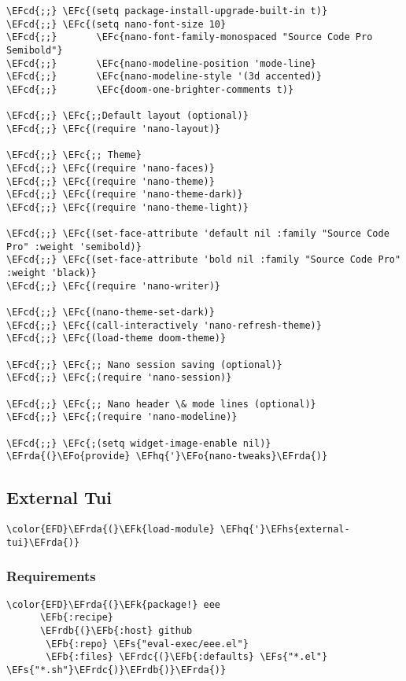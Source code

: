 \documentclass[a4wide,10pt]{article}
\newcommand{\EFc}[1]{\textcolor{EFc}{#1}} %
\newcommand{\EFcd}[1]{\textcolor{EFcd}{#1}} %
\newcommand{\EFs}[1]{\textcolor{EFs}{#1}} %
\newcommand{\EFk}[1]{\textcolor{EFk}{#1}} %
\newcommand{\EFb}[1]{\textcolor{EFb}{#1}} %
\newcommand{\EFo}[1]{\textcolor{EFo}{#1}} %
\newcommand{\EFhq}[1]{\textcolor{EFhq}{#1}} %
\newcommand{\EFhs}[1]{\textcolor{EFhs}{#1}} %
\newcommand{\EFrda}[1]{\textcolor{EFrda}{#1}} %
\newcommand{\EFrdb}[1]{\textcolor{EFrdb}{#1}} %
\newcommand{\EFrdc}[1]{\textcolor{EFrdc}{#1}} %
\begin{document}
\begin{Code}
\begin{Verbatim}
\EFcd{;;} \EFc{(setq package-install-upgrade-built-in t)}
\EFcd{;;} \EFc{(setq nano-font-size 10}
\EFcd{;;}       \EFc{nano-font-family-monospaced "Source Code Pro Semibold"}
\EFcd{;;}       \EFc{nano-modeline-position 'mode-line}
\EFcd{;;}       \EFc{nano-modeline-style '(3d accented)}
\EFcd{;;}       \EFc{doom-one-brighter-comments t)}

\EFcd{;;} \EFc{;;Default layout (optional)}
\EFcd{;;} \EFc{(require 'nano-layout)}

\EFcd{;;} \EFc{;; Theme}
\EFcd{;;} \EFc{(require 'nano-faces)}
\EFcd{;;} \EFc{(require 'nano-theme)}
\EFcd{;;} \EFc{(require 'nano-theme-dark)}
\EFcd{;;} \EFc{(require 'nano-theme-light)}

\EFcd{;;} \EFc{(set-face-attribute 'default nil :family "Source Code Pro" :weight 'semibold)}
\EFcd{;;} \EFc{(set-face-attribute 'bold nil :family "Source Code Pro" :weight 'black)}
\EFcd{;;} \EFc{(require 'nano-writer)}

\EFcd{;;} \EFc{(nano-theme-set-dark)}
\EFcd{;;} \EFc{(call-interactively 'nano-refresh-theme)}
\EFcd{;;} \EFc{(load-theme doom-theme)}

\EFcd{;;} \EFc{;; Nano session saving (optional)}
\EFcd{;;} \EFc{;(require 'nano-session)}

\EFcd{;;} \EFc{;; Nano header \& mode lines (optional)}
\EFcd{;;} \EFc{;(require 'nano-modeline)}

\EFcd{;;} \EFc{;(setq widget-image-enable nil)}
\EFrda{(}\EFo{provide} \EFhq{'}\EFo{nano-tweaks}\EFrda{)}
\end{Verbatim}
\end{Code}
\subsection{External Tui}
\label{sec:orgf279e50}
\begin{Code}
\begin{Verbatim}
\color{EFD}\EFrda{(}\EFk{load-module} \EFhq{'}\EFhs{external-tui}\EFrda{)}
\end{Verbatim}
\end{Code}
\subsubsection{Requirements}
\label{sec:org4cb04ca}
\begin{Code}
\begin{Verbatim}
\color{EFD}\EFrda{(}\EFk{package!} eee
      \EFb{:recipe}
      \EFrdb{(}\EFb{:host} github
       \EFb{:repo} \EFs{"eval-exec/eee.el"}
       \EFb{:files} \EFrdc{(}\EFb{:defaults} \EFs{"*.el"} \EFs{"*.sh"}\EFrdc{)}\EFrdb{)}\EFrda{)}

\end{Verbatim}
\end{Code}
\end{document}
